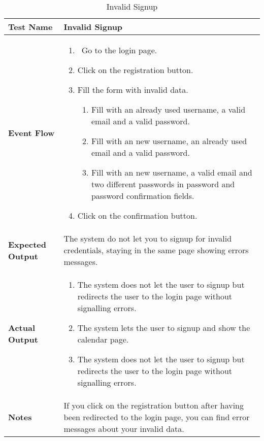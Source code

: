 \begin{table}[h]	
	\centering
	\def\arraystretch{1.5}
	\begin{tabular}{|m{7cm}|m{7cm}|}
		\hline
		\textbf{Test Name}            &  Invalid Signup  \\ \hline
		\textbf{Event Flow}             &  
		\begin{enumerate}
			\item~Go to the login page.
			\item Click on the registration button.
			\item Fill the form with invalid data.
			\begin{enumerate}[label*=\arabic*.]			
				\item Fill with an already used username, a valid email and a valid password.
				\item Fill with an new username, an already used email and a valid password.
				\item Fill with an new username, a valid email and two different passwords in password and password confirmation fields.
			\end{enumerate}
		\item Click on the confirmation button.
		\end{enumerate} \\ \hline
		\textbf{Expected Output}  &  The system do not let you to signup for invalid credentials, staying in the same page showing errors messages.   \\ \hline
		\textbf{Actual Output}       & 
		\begin{enumerate}
			\item The system does not let the user to signup but redirects the user to the login page without signalling errors.
			\item The system lets the user to signup and show the calendar page.
			\item The system does not let the user to signup but redirects the user to the login page without signalling errors.
		\end{enumerate}    \\ \hline
		\textbf{Notes} &  If you click on the registration button after having been redirected to the login page, you can find error messages about your invalid data. \\ \hline
	\end{tabular}
	\caption{Invalid Signup}
\end{table}


